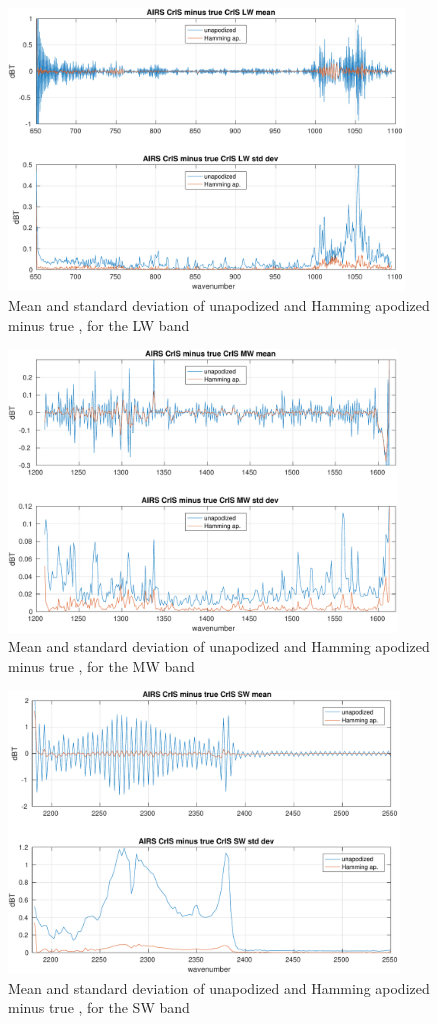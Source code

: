 \documentclass[11pt]{article}
\begin{document}
\begin{figure} %
  \centering
  \includegraphics[height=7.5cm]{figures/a2cris_diff_LW.pdf}
  \caption{Mean and standard deviation of unapodized and Hamming
    apodized {\airs} {\cris} minus true {\cris}, for the {\cris} LW
    band}
  \label{diffLW}
\end{figure}

\begin{figure} %
  \centering
  \includegraphics[height=7.5cm]{figures/a2cris_diff_MW.pdf}
  \caption{Mean and standard deviation of unapodized and Hamming
    apodized {\airs} {\cris} minus true {\cris}, for the {\cris} MW
    band}
  \label{diffMW}
\end{figure}

\begin{figure} %
  \centering
  \includegraphics[height=7.5cm]{figures/a2cris_diff_SW.pdf}
  \caption{Mean and standard deviation of unapodized and Hamming
    apodized {\airs} {\cris} minus true {\cris}, for the {\cris} SW
    band}
  \label{diffSW}
\end{figure}
\end{document}
